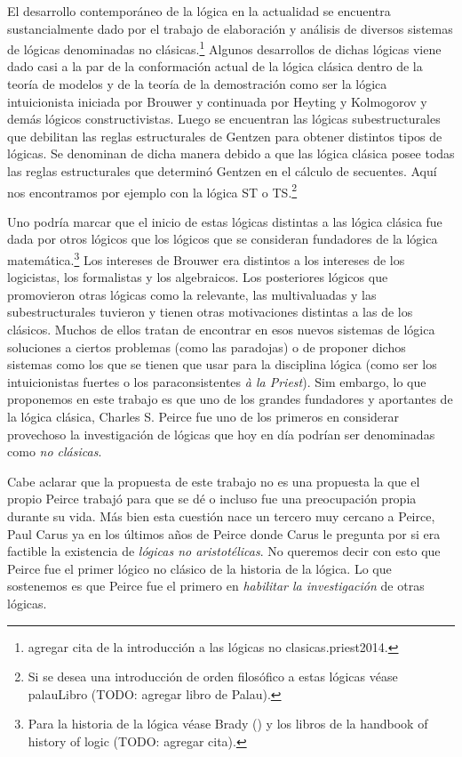 \documentclass[
  structure  = article,
  pagelayout = periodicalaureo,%
  secfont    = italic,
  subsecfont = italic,
  version    = final,%
]{suftesi}
\begin{document}
El desarrollo contemporáneo de la lógica en la actualidad se encuentra sustancialmente dado por el trabajo de elaboración y análisis de diversos sistemas de lógicas denominadas no clásicas.\footnote{agregar cita de la introducción a las lógicas no clasicas.priest2014.} Algunos desarrollos de dichas lógicas viene dado casi a la par de la conformación actual de la lógica clásica dentro de la teoría de modelos y de la teoría de la demostración como ser la lógica intuicionista iniciada por Brouwer y continuada por Heyting y Kolmogorov y demás lógicos constructivistas. Luego se encuentran las lógicas subestructurales\cite{dosen1993, paoli2002} que debilitan las reglas estructurales de Gentzen\cite{gentzen1964} para obtener distintos tipos de lógicas. Se denominan de dicha manera debido a que las lógica clásica posee todas las reglas estructurales que determinó Gentzen en el cálculo de secuentes. Aquí nos encontramos por ejemplo con la lógica ST o TS\cite{cobreros2012, barrio2015}.\footnote{Si se desea una introducción de orden filosófico a estas lógicas véase palauLibro (TODO: agregar libro de Palau).}

Uno podría marcar que el inicio de estas lógicas distintas a las lógica clásica fue dada por otros lógicos que los lógicos que se consideran fundadores de la lógica matemática.\footnote{Para la historia de la lógica véase Brady (\citeyear{brady2011}) y los libros de la handbook of history of logic (TODO: agregar cita).} Los
intereses de Brouwer era distintos a los intereses de los logicistas, los formalistas y los algebraicos. Los posteriores lógicos que promovieron otras lógicas como la relevante, las multivaluadas y las subestructurales tuvieron y tienen otras motivaciones distintas a las de los clásicos. Muchos de ellos tratan de encontrar en esos nuevos sistemas de lógica soluciones a ciertos problemas (como las paradojas) o de proponer dichos sistemas como los que se tienen que usar para la disciplina lógica (como ser los intuicionistas fuertes o los paraconsistentes \emph{à la Priest}). Sim embargo, lo que proponemos en este trabajo es que uno de los grandes fundadores y aportantes de la lógica clásica, Charles S. Peirce fue uno de los primeros en considerar provechoso la investigación de lógicas que hoy en día podrían ser denominadas como \emph{no clásicas}.

Cabe aclarar que la propuesta de este trabajo no es una propuesta la que el propio Peirce trabajó para que se dé o incluso fue una preocupación propia durante su vida. Más bien esta cuestión nace un tercero muy cercano a Peirce, Paul Carus ya en los últimos años de Peirce donde Carus le pregunta por si era factible la existencia de \emph{lógicas no aristotélicas}. No queremos decir con esto que Peirce fue el primer lógico no clásico de la historia de la lógica. Lo que sostenemos es que Peirce fue el primero en \emph{habilitar la investigación} de otras lógicas.
\end{document}
